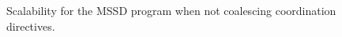 \begin{figure}[]
        \caption{Scalability for the MSSD program when not coalescing
        coordination directives.}

        \label{fig:coordination:results_sssp_unbuffered}
\end{figure}
